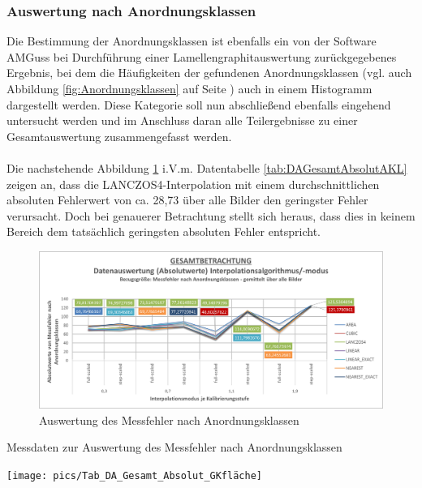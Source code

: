 \documentclass[
fontsize=10pt, 
listof = totoc,
parskip = half	
]{report}
\begin{document}
\subsubsection{Auswertung nach Anordnungsklassen}
\label{subsubsec:AuswertungAKL}
Die Bestimmung der Anordnungsklassen ist ebenfalls ein von der Software AMGuss bei Durchführung einer Lamellengraphitauswertung zurückgegebenes Ergebnis, bei dem die Häufigkeiten der gefundenen Anordnungsklassen (vgl. auch Abbildung \ref{fig:Anordnungsklassen} auf Seite \pageref{fig:Anordnungsklassen}) auch in einem Histogramm dargestellt werden.  Diese Kategorie soll nun abschließend ebenfalls eingehend untersucht werden und im Anschluss daran alle Teilergebnisse zu einer Gesamtauswertung zusammengefasst werden.
\\\\
\noindent Die nachstehende Abbildung \ref{fig:DAGesamtAbsolutAKL} i.V.m. Datentabelle \ref{tab:DAGesamtAbsolutAKL} zeigen an, dass die LANCZOS4-Interpolation mit einem durchschnittlichen absoluten Fehlerwert von ca. 28,73 über alle Bilder den geringster Fehler verursacht. Doch bei genauerer Betrachtung stellt sich heraus, dass dies in keinem Bereich dem tatsächlich geringsten absoluten Fehler entspricht. 

\begin{figure}[H]
	\centering
	\includegraphics[width=\textwidth, height=\textheight, keepaspectratio]{pics/DA_Gesamt_Absolut_AKL}
	\caption{Auswertung des Messfehler nach Anordnungsklassen}
	\label{fig:DAGesamtAbsolutAKL}
\end{figure}

\begin{table}[H]
	\caption{Messdaten zur Auswertung des Messfehler nach Anordnungsklassen}
	\centering
	\texttt{[image: pics/Tab\_DA\_Gesamt\_Absolut\_GKfläche]}
	\label{tab:DAGesamtAbsolutAKL}
\end{table}
\end{document}
